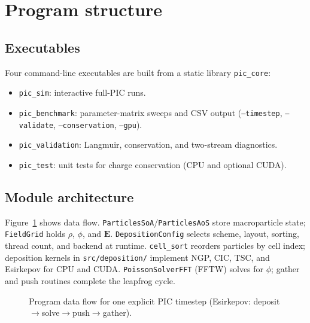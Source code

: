 \section{Program structure}
\label{sec:program}

\subsection{Executables}
Four command-line executables are built from a static library \texttt{pic\_core}:
\begin{itemize}
    \item \texttt{pic\_sim}: interactive full-PIC runs.
    \item \texttt{pic\_benchmark}: parameter-matrix sweeps and CSV output (\texttt{--timestep}, \texttt{--validate}, \texttt{--conservation}, \texttt{--gpu}).
    \item \texttt{pic\_validation}: Langmuir, conservation, and two-stream diagnostics.
    \item \texttt{pic\_test}: unit tests for charge conservation (CPU and optional CUDA).
\end{itemize}

\subsection{Module architecture}
Figure~\ref{fig:architecture} shows data flow.
\texttt{ParticlesSoA}/\texttt{ParticlesAoS} store macroparticle state; \texttt{FieldGrid} holds $\rho$, $\phi$, and $\mathbf{E}$.
\texttt{DepositionConfig} selects scheme, layout, sorting, thread count, and backend at runtime.
\texttt{cell\_sort} reorders particles by cell index; deposition kernels in \texttt{src/deposition/} implement NGP, CIC, TSC, and Esirkepov for CPU and CUDA.
\texttt{PoissonSolverFFT} (FFTW) solves for $\phi$; gather and push routines complete the leapfrog cycle.

\begin{figure}[t]
\centering
{}
\caption{Program data flow for one explicit PIC timestep (Esirkepov: deposit$\rightarrow$solve$\rightarrow$push$\rightarrow$gather).}
\label{fig:architecture}
\end{figure}

